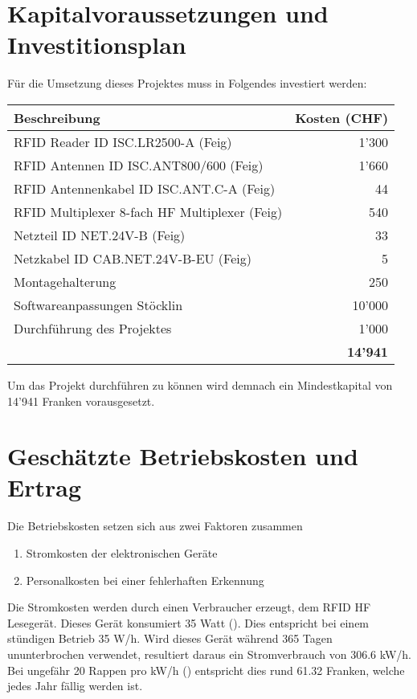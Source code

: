 \chapter{Kapitalvoraussetzungen und Investitionsplan}
Für die Umsetzung dieses Projektes muss in Folgendes investiert werden:

\vspace{1em}

\begin{tabularx}{\textwidth}{|X|r|}
	\hline
	\textbf{Beschreibung} & \textbf{Kosten (CHF)} \\
	\hline
	RFID Reader ID ISC.LR2500-A (Feig) & 1'300 \\
	\hline
	RFID Antennen ID ISC.ANT800/600 (Feig)& 1'660 \\
	\hline
	RFID Antennenkabel ID ISC.ANT.C-A (Feig) & 44 \\
	\hline
	RFID Multiplexer 8-fach HF Multiplexer (Feig) & 540 \\
	\hline
	Netzteil ID NET.24V-B (Feig) & 33 \\
	\hline
	Netzkabel ID CAB.NET.24V-B-EU (Feig) & 5 \\
	\hline
	Montagehalterung & 250 \\
	\hline
	Softwareanpassungen Stöcklin & 10'000 \\
	\hline
	Durchführung des Projektes & 1'000 \\
	\hline
	\hline
	 & \textbf{14'941} \\
	 \hline
\end{tabularx}

\vspace{1em}

Um das Projekt durchführen zu können wird demnach ein Mindestkapital von 14'941 Franken vorausgesetzt.

\chapter{Geschätzte Betriebskosten und Ertrag}
Die Betriebskosten setzen sich aus zwei Faktoren zusammen
\begin{enumerate}
	\item Stromkosten der elektronischen Geräte
	\item Personalkosten bei einer fehlerhaften Erkennung
\end{enumerate}

Die Stromkosten werden durch einen Verbraucher erzeugt, dem RFID HF Lesegerät. Dieses Gerät konsumiert 35 Watt (\cite{DatenblattRFIDReader}). Dies entspricht bei einem stündigen Betrieb 35 W/h. Wird dieses Gerät während 365 Tagen ununterbrochen verwendet, resultiert daraus ein Stromverbrauch von 306.6 kW/h. Bei ungefähr 20 Rappen pro kW/h (\cite{StromPreisAdmin2019}) entspricht dies rund 61.32 Franken, welche jedes Jahr fällig werden ist.

